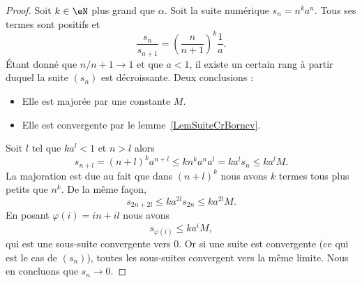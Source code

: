 \begin{proof}
	Soit \( k\in \eN\) plus grand que \( \alpha\).
	Soit la suite numérique \( s_n=n^ka^n\). Tous ses termes sont positifs et
	\begin{equation}
		\frac{ s_n }{ s_{n+1} }=\left( \frac{ n }{ n+1 } \right)^k\frac{1}{ a }.
	\end{equation}
	Étant donné que \( n/n+1\to 1\) et que \( a<1\), il existe un certain rang à partir duquel la suite \( (s_n)\) est décroissante. Deux conclusions :
	\begin{itemize}
		\item Elle est majorée par une constante \( M\).
		\item Elle est convergente par le lemme~\ref{LemSuiteCrBorncv}.
	\end{itemize}
	Soit \( l\) tel que \( ka^l<1\) et \( n>l\) alors
	\begin{equation}
		s_{n+l}=(n+l)^ka^{n+l}\leq kn^ka^na^l=ka^ls_n\leq ka^lM.
	\end{equation}
	La majoration est due au fait que dans \( (n+l)^k\) nous avons \( k\) termes tous plus petits que \( n^k\). De la même façon,
	\begin{equation}
		s_{2n+2l}\leq ka^{2l}s_{2n}\leq ka^{2l}M.
	\end{equation}
	En posant \( \varphi(i)=in+il\) nous avons
	\begin{equation}
		s_{\varphi(i)}\leq ka^iM,
	\end{equation}
	qui est une sous-suite convergente vers \( 0\). Or si une suite est convergente (ce qui est le cas de \( (s_n)\)), toutes les sous-suites convergent vers la même limite. Nous en concluons que \( s_n\to 0\).
\end{proof}

